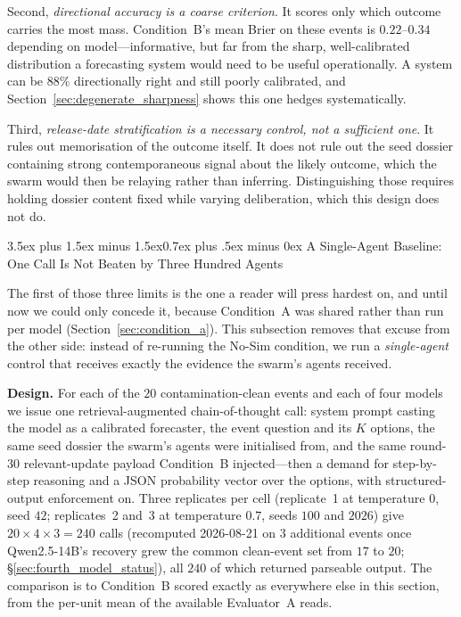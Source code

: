 \documentclass[11pt,journal,onecolumn]{IEEEtran}
\makeatletter
\renewcommand\subsection{\@startsection{subsection}{2}{\z@}%
  {3.5ex plus 1.5ex minus 1.5ex}{0.7ex plus .5ex minus 0ex}%
  {\normalfont\normalsize\bfseries}}
\makeatother
\begin{document}
Second, \emph{directional accuracy is a coarse criterion}. It scores only which outcome carries the most mass. Condition~B's mean Brier on these events is $0.22$--$0.34$ depending on model---informative, but far from the sharp, well-calibrated distribution a forecasting system would need to be useful operationally. A system can be $88\%$ directionally right and still poorly calibrated, and Section~\ref{sec:degenerate_sharpness} shows this one hedges systematically.

Third, \emph{release-date stratification is a necessary control, not a sufficient one}. It rules out memorisation of the outcome itself. It does not rule out the seed dossier containing strong contemporaneous signal about the likely outcome, which the swarm would then be relaying rather than inferring. Distinguishing those requires holding dossier content fixed while varying deliberation, which this design does not do.

\subsection{A Single-Agent Baseline: One Call Is Not Beaten by Three Hundred Agents}
\label{sec:cot_baseline}

The first of those three limits is the one a reader will press hardest on, and until now we could only concede it, because Condition~A was shared rather than run per model (Section~\ref{sec:condition_a}). This subsection removes that excuse from the other side: instead of re-running the No-Sim condition, we run a \emph{single-agent} control that receives exactly the evidence the swarm's agents received.

\textbf{Design.} For each of the $20$ contamination-clean events and each of four models we issue one retrieval-augmented chain-of-thought call: system prompt casting the model as a calibrated forecaster, the event question and its $K$ options, the same seed dossier the swarm's agents were initialised from, and the same round-$30$ relevant-update payload Condition~B injected---then a demand for step-by-step reasoning and a JSON probability vector over the options, with structured-output enforcement on. Three replicates per cell (replicate~1 at temperature $0$, seed $42$; replicates~2 and~3 at temperature $0.7$, seeds $100$ and $2026$) give $20 \times 4 \times 3 = 240$ calls (recomputed 2026-08-21 on $3$ additional events once Qwen2.5-14B's recovery grew the common clean-event set from $17$ to $20$; \S\ref{sec:fourth_model_status}), all $240$ of which returned parseable output. The comparison is to Condition~B scored exactly as everywhere else in this section, from the per-unit mean of the available Evaluator~A reads.
\end{document}
